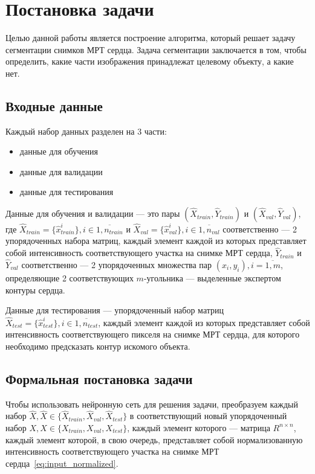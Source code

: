 \section{Постановка задачи}

Целью данной работы является построение алгоритма, который решает задачу сегментации снимков МРТ сердца. Задача сегментации заключается в том, чтобы определить, какие части изображения принадлежат целевому объекту, а какие нет. 

\subsection{Входные данные}

Каждый набор данных разделен на 3 части: 

\begin{itemize}
  \item данные для обучения
  \item данные для валидации
  \item данные для тестирования
\end{itemize}

Данные для обучения и валидации — это пары $(\hat{X}_{train},\hat{Y}_{train})$ и $(\hat{X}_{val},\hat{Y}_{val})$, где $\hat{X}_{train} = \{\hat{x}_{train}^{i}\}, i\in{}\overline{1,n_{train}}$ и $\hat{X}_{val} = \{\hat{x}_{val}^{i}\}, i\in{}\overline{1,n_{val}}$ соответственно — 2 упорядоченных набора матриц, каждый элемент каждой из которых представляет собой интенсивность соответствующего участка на снимке МРТ сердца, $\hat{Y}_{train}$ и $\hat{Y}_{val}$ соответственно — 2 упорядоченных множества пар $(x_{i},y_{i}), i = \overline{1,m}$, определяющие 2 соответствующих \mbox{$m$-угольника} — выделенные экспертом контуры сердца.

Данные для тестирования — упорядоченный набор матриц $\hat{X}_{test} = \{\hat{x}_{test}^{i}\}, i\in{}\overline{1,n_{test}}$, каждый элемент каждой из которых представляет собой интенсивность соответствующего пикселя на снимке МРТ сердца, для которого необходимо предсказать контур искомого объекта.

\subsection{Формальная постановка задачи}

Чтобы использовать нейронную сеть для решения задачи, преобразуем каждый набор $\hat{X},\hat{X}\in{}\{\hat{X}_{train},\hat{X}_{val},\hat{X}_{test}\}$ в соответствующий новый упорядоченный набор $X,X\in{}\{X_{train},X_{val},X_{test}\}$, каждый элемент которого — матрица $R^{n\times{}n}$, каждый элемент которой, в свою очередь, представляет собой нормализованную интенсивность соответствующего участка на снимке МРТ сердца~\eqref{eq:input_normalized}. 

